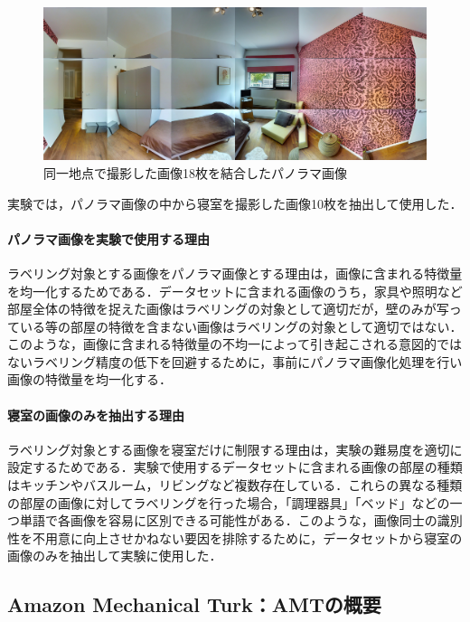 \documentclass[a4paper,11pt]{jreport}
\begin{document}
\begin{figure}[H]
  \centering
  \includegraphics[width=\linewidth]{figures/panorama.jpeg}
  \caption{同一地点で撮影した画像18枚を結合したパノラマ画像}
  \label{fig:panorama_example}
\end{figure}

実験では，パノラマ画像の中から寝室を撮影した画像10枚を抽出して使用した．

\paragraph{パノラマ画像を実験で使用する理由}
ラベリング対象とする画像をパノラマ画像とする理由は，画像に含まれる特徴量を均一化するためである．データセットに含まれる画像のうち，家具や照明など部屋全体の特徴を捉えた画像はラベリングの対象として適切だが，壁のみが写っている等の部屋の特徴を含まない画像はラベリングの対象として適切ではない．このような，画像に含まれる特徴量の不均一によって引き起こされる意図的ではないラベリング精度の低下を回避するために，事前にパノラマ画像化処理を行い画像の特徴量を均一化する．

\paragraph{寝室の画像のみを抽出する理由}
ラベリング対象とする画像を寝室だけに制限する理由は，実験の難易度を適切に設定するためである．実験で使用するデータセットに含まれる画像の部屋の種類はキッチンやバスルーム，リビングなど複数存在している．これらの異なる種類の部屋の画像に対してラベリングを行った場合，「調理器具」「ベッド」などの一つ単語で各画像を容易に区別できる可能性がある．このような，画像同士の識別性を不用意に向上させかねない要因を排除するために，データセットから寝室の画像のみを抽出して実験に使用した．

\subsection{Amazon Mechanical Turk：AMTの概要}
\end{document}

